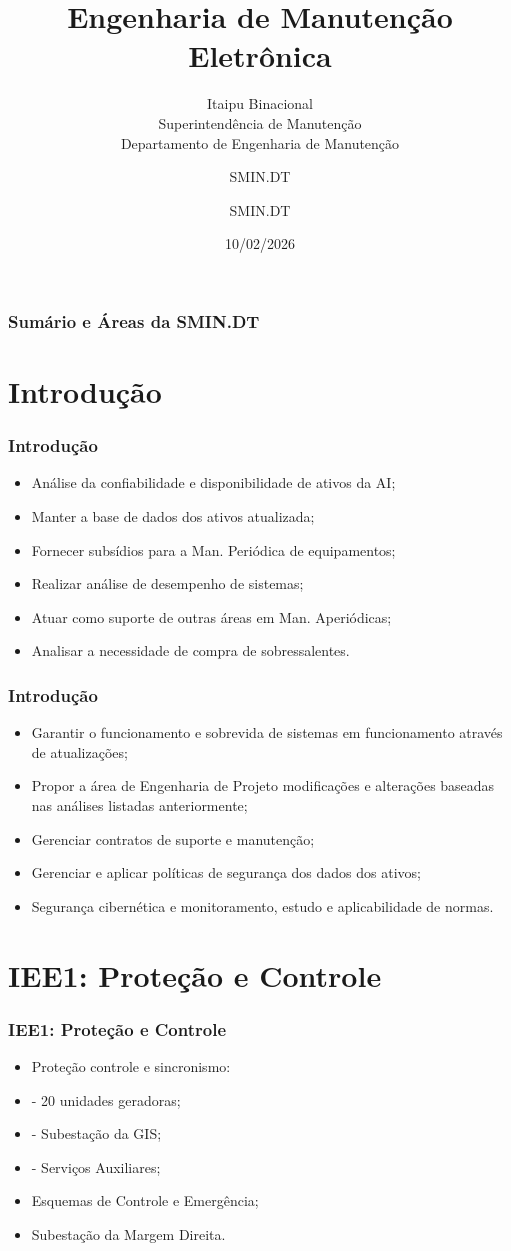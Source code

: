 \documentclass{beamer}
\title{\textbf{Engenharia de Manutenção Eletrônica\\}}
\subtitle{Itaipu Binacional \\ Superintendência de Manutenção \\ Departamento de Engenharia de Manutenção}
\author{SMIN.DT}
\author{SMIN.DT}
\date{10/02/2026}
\begin{document}
\frame{\titlepage}

\begin{frame}
\frametitle{Sumário e Áreas da SMIN.DT}
\tableofcontents
\end{frame}

\section[Introdução]{Introdução}
\begin{frame}
\frametitle{Introdução}
\begin{itemize}
    \item Análise da confiabilidade e disponibilidade de ativos da AI;
    \item Manter a base de dados dos ativos atualizada;
    \item Fornecer subsídios para a Man. Periódica de equipamentos;
    \item Realizar análise de desempenho de sistemas;
    \item Atuar como suporte de outras áreas em Man. Aperiódicas;
    \item Analisar a necessidade de compra de sobressalentes.
    \end{itemize}
\end{frame}

\begin{frame}
\frametitle{Introdução}
\begin{itemize}
    \item Garantir o funcionamento e sobrevida de sistemas em funcionamento através de atualizações;
    \item Propor a área de Engenharia de Projeto modificações e alterações baseadas nas análises listadas anteriormente;
    \item Gerenciar contratos de suporte e manutenção;
    \item Gerenciar e aplicar políticas de segurança dos dados dos ativos;
    \item Segurança cibernética e monitoramento, estudo e aplicabilidade de normas.
\end{itemize}
\end{frame}

\section[IEE1]{IEE1: Proteção e Controle}
\begin{frame}
\frametitle{IEE1: Proteção e Controle}
\begin{itemize}
    \item Proteção controle e sincronismo:
    \item - 20 unidades geradoras;
    \item - Subestação da GIS; 
    \item - Serviços Auxiliares;
    \item Esquemas de Controle e Emergência;
    \item Subestação da Margem Direita.
\end{itemize}
\end{frame}
\end{document}
